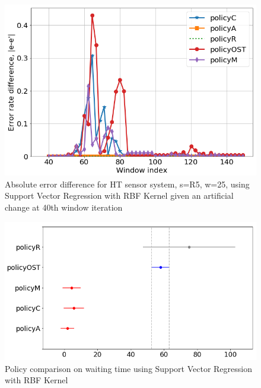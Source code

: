 \documentclass{mpaper}
\begin{document}
\begin{figure}[h]
    \centering
    \includegraphics[scale=0.33]{imgs/svr_rbf_R5_w25.png}
    \caption{Absolute error difference for HT sensor system, s=R5, w=25,
    using Support Vector Regression with RBF Kernel 
    given an artificial change at 40th window iteration}
    \label{fig:err_rbf_svr_R5}
\end{figure}
\begin{figure}[h]
    \centering
    \includegraphics[scale=0.35]{imgs/svr_rbf_R5_waiting_plot_diff_means.png}
    \caption{Policy comparison on waiting time using Support Vector Regression with RBF Kernel}
    \label{fig:svr_rbf_R5_waiting_plot_diff_means}
\end{figure}
\end{document}
